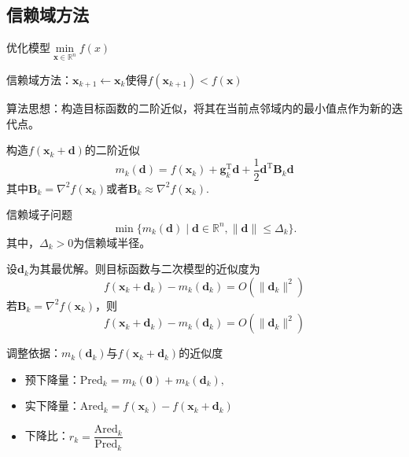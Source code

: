 \subsection{信赖域方法}
优化模型$\min\limits_{\boldsymbol{x}\in\mathbb{R}^n}f(x)$

信赖域方法：$\boldsymbol{x}_{k+1}\gets \boldsymbol{x}_{k}$使得$f(\boldsymbol{x}_{k+1})<f(\boldsymbol{x})$

算法思想：构造目标函数的二阶近似，将其在当前点邻域内的最小值点作为新的迭代点。

构造$f(\boldsymbol{x}_k+\boldsymbol{d})$的二阶近似
\[
    m_{k}(\boldsymbol{d})=f(\boldsymbol{x}_{k})+\boldsymbol{g}_{k}^{\mathrm{T}}\boldsymbol{d}+\frac{1}{2}\boldsymbol{d}^{\mathrm{T}}\boldsymbol{B}_{k}\boldsymbol{d}
\]
其中$\boldsymbol{B}_{k}=\nabla^{2}f(\boldsymbol{x}_{k})$或者$\boldsymbol{B}_{k}\approx\nabla^{2}f(\boldsymbol{x}_{k}).$

\begin{note}
    信赖域子问题
    \[
        \min\{m_k(\boldsymbol{d})\mid\boldsymbol{d}\in\mathbb{R}^n,\lVert\boldsymbol{d}\rVert\leqslant\Delta_k\}.
    \]
    其中，$\Delta_{k}>0$为信赖域半径。

    设$\boldsymbol{d}_k$为其最优解。则目标函数与二次模型的近似度为
    \[
        f(\boldsymbol{x}_k+\boldsymbol{d}_k)-m_k(\boldsymbol{d}_k)=O(\|\boldsymbol{d}_k\|^2)
    \]
    若$\boldsymbol{B}_{k}=\nabla^{2}f(\boldsymbol{x}_{k})$，则
    \[
        f(\boldsymbol{x}_k+\boldsymbol{d}_k)-m_k(\boldsymbol{d}_k)=O(\|\boldsymbol{d}_k\|^2)
    \]
\end{note}
\begin{note}
    调整依据：$m_{k}(\boldsymbol{d}_k)$与$f(\boldsymbol{\boldsymbol{x}}_k+\boldsymbol{d}_k)$的近似度

    \begin{itemize}
        \item 预下降量：$\mathrm{Pred}_{k}=m_{k}(\boldsymbol{0})+m_{k}(\boldsymbol{d}_{k}),$
        \item 实下降量：$\mathrm{Ared}_k=f(\boldsymbol{x}_k)-f(\boldsymbol{x}_k+\boldsymbol{d}_k)$
        \item 下降比：$r_{k}={\dfrac{\mathrm{Ared}_{k}}{\mathrm{Pred}_{k}}}$
    \end{itemize}
\end{note}

